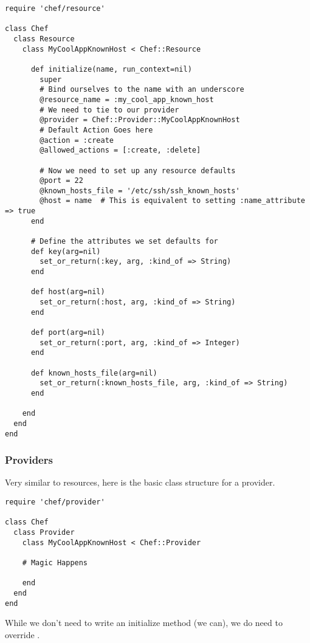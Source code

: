 \begin{lstlisting}[label=lst:cookbook-hwrp4]
require 'chef/resource'

class Chef
  class Resource
    class MyCoolAppKnownHost < Chef::Resource

      def initialize(name, run_context=nil)
        super
        # Bind ourselves to the name with an underscore
        @resource_name = :my_cool_app_known_host
        # We need to tie to our provider
        @provider = Chef::Provider::MyCoolAppKnownHost
        # Default Action Goes here
        @action = :create
        @allowed_actions = [:create, :delete]

        # Now we need to set up any resource defaults
        @port = 22
        @known_hosts_file = '/etc/ssh/ssh_known_hosts'
        @host = name  # This is equivalent to setting :name_attribute => true
      end

      # Define the attributes we set defaults for
      def key(arg=nil)
        set_or_return(:key, arg, :kind_of => String)
      end

      def host(arg=nil)
        set_or_return(:host, arg, :kind_of => String)
      end

      def port(arg=nil)
        set_or_return(:port, arg, :kind_of => Integer)
      end

      def known_hosts_file(arg=nil)
        set_or_return(:known_hosts_file, arg, :kind_of => String)
      end

    end
  end
end
\end{lstlisting}

\subsubsection{Providers}

Very similar to resources, here is the basic class structure for a provider.

\begin{lstlisting}[label=lst:cookbook-hwrp5]
require 'chef/provider'

class Chef
  class Provider
    class MyCoolAppKnownHost < Chef::Provider

    # Magic Happens

    end
  end
end
\end{lstlisting}

While we don’t need to write an initialize method (we can), we do need to override .

